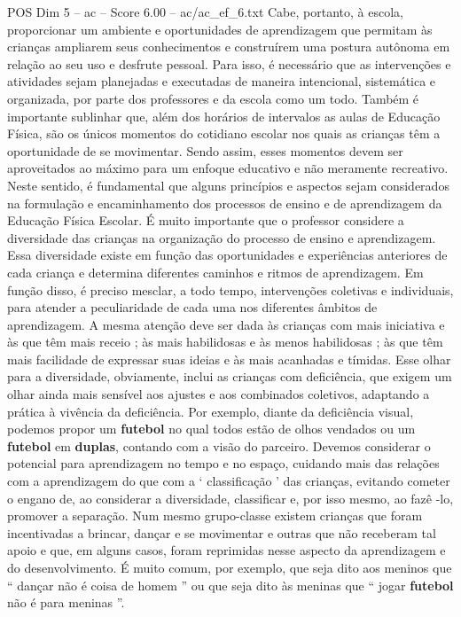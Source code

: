 \begin{textsample}{POS Dim 5 – ac – Score 6.00 – ac/ac\_ef\_6.txt}
Cabe, portanto, à escola, proporcionar um ambiente e oportunidades de aprendizagem que permitam às crianças ampliarem seus conhecimentos e construírem uma postura autônoma em relação ao seu uso e desfrute pessoal.
Para isso, é necessário que as intervenções e atividades sejam planejadas e executadas de maneira intencional, sistemática e organizada, por parte dos professores e da escola como um todo.
Também é importante sublinhar que, além dos horários de intervalos as aulas de Educação Física, são os únicos momentos do cotidiano escolar nos quais as crianças têm a oportunidade de se movimentar.
Sendo assim, esses momentos devem ser aproveitados ao máximo para um enfoque educativo e não meramente recreativo.
Neste sentido, é fundamental que alguns princípios e aspectos sejam considerados na formulação e encaminhamento dos processos de ensino e de aprendizagem da Educação Física Escolar.
É muito importante que o professor considere a diversidade das crianças na organização do processo de ensino e aprendizagem.
Essa diversidade existe em função das oportunidades e experiências anteriores de cada criança e determina diferentes caminhos e ritmos de aprendizagem.
Em função disso, é preciso mesclar, a todo tempo, intervenções coletivas e individuais, para atender a peculiaridade de cada uma nos diferentes âmbitos de aprendizagem.
A mesma atenção deve ser dada às crianças com mais iniciativa e às que têm mais receio ; às mais habilidosas e às menos habilidosas ; às que têm mais facilidade de expressar suas ideias e às mais acanhadas e tímidas.
Esse olhar para a diversidade, obviamente, inclui as crianças com deficiência, que exigem um olhar ainda mais sensível aos ajustes e aos combinados coletivos, adaptando a prática à vivência da deficiência.
Por exemplo, diante da deficiência visual, podemos propor um \textbf{futebol} no qual todos estão de olhos vendados ou um \textbf{futebol} em \textbf{duplas}, contando com a visão do parceiro.
Devemos considerar o potencial para aprendizagem no tempo e no espaço, cuidando mais das relações com a aprendizagem do que com a ‘ classificação ’ das crianças, evitando cometer o engano de, ao considerar a diversidade, classificar e, por isso mesmo, ao fazê -lo, promover a separação.
Num mesmo grupo-classe existem crianças que foram incentivadas a brincar, dançar e se movimentar e outras que não receberam tal apoio e que, em alguns casos, foram reprimidas nesse aspecto da aprendizagem e do desenvolvimento.
É muito comum, por exemplo, que seja dito aos meninos que “ dançar não é coisa de homem ” ou que seja dito às meninas que “ jogar \textbf{futebol} não é para meninas ”.

\end{textsample}
